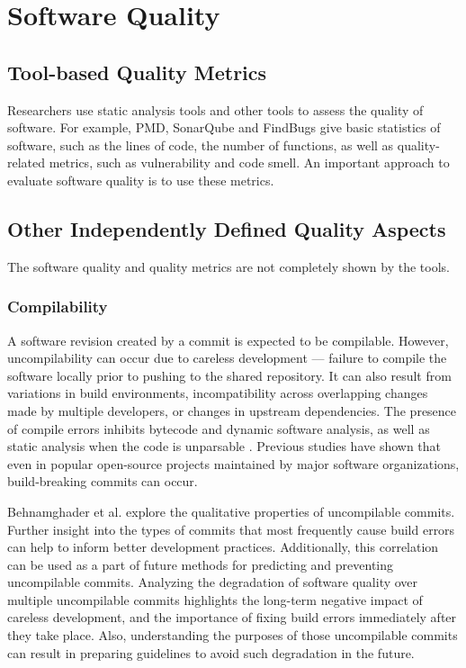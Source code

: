 \section{Software Quality}
\label{sec:quality}

\subsection{Tool-based Quality Metrics}
Researchers use static analysis tools and other tools to assess the quality of software. 
For example, PMD, SonarQube and FindBugs give basic statistics of software, such as the lines of code, the number of functions, as well as quality-related metrics, such as vulnerability and code smell.
An important approach to evaluate software quality is to use these metrics.


\subsection{Other Independently Defined Quality Aspects}
The software quality and quality metrics are not completely shown by the tools.
\subsubsection{Compilability}

A software revision created by a commit is expected to be compilable. However, uncompilability can occur due to careless development --- failure to compile the software locally prior to pushing to the shared repository. It can also result from variations in build environments, incompatibility across overlapping changes made by multiple developers, or changes in upstream dependencies. 
The presence of compile errors inhibits bytecode and dynamic software analysis, as well as static analysis when the code is unparsable \cite{pooyan_esem}.
Previous studies \cite{pooyan_esem, 8170083, Hassan2017ESEM, SMR:SMR1838} have shown that even in popular open-source projects maintained by major software organizations, build-breaking commits can occur.

Behnamghader et al. \cite{pooyan_qrs} explore the qualitative properties of uncompilable commits.
Further insight into the types of commits that most frequently cause build errors can help to inform better development practices. Additionally, this correlation can be used as a part of future methods for predicting and preventing uncompilable commits. 
Analyzing the degradation of software quality over multiple uncompilable commits highlights the long-term negative impact of careless development, and the importance of fixing build errors immediately after they take place.
Also, understanding the purposes of those uncompilable commits can result in preparing guidelines to avoid such degradation in the future.



